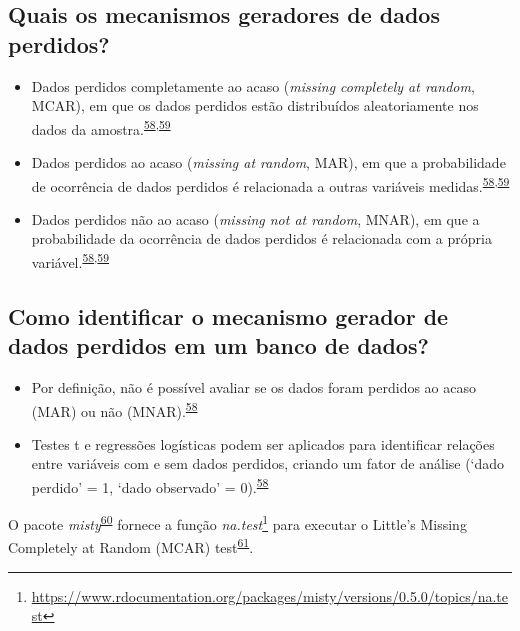 \documentclass[
  a4paper,
]{book}
\renewcommand{\href}[2]{#2\footnote{\url{#1}}}
\newenvironment{infobox}[1]
  {
  \begin{itemize}
  \renewcommand{\labelitemi}{
    \raisebox{-.7\height}[0pt][0pt]{
      {\setkeys{Gin}{width=3em,keepaspectratio}
        \texttt{[image: \#1]}}
    }
  }
  \setlength{\fboxsep}{1em}
  \begin{blackbox}
  \item
  }
  {
  \end{blackbox}
  \end{itemize}
  }
\begin{document}
\hypertarget{quais-os-mecanismos-geradores-de-dados-perdidos}{%
\subsection{Quais os mecanismos geradores de dados perdidos?}\label{quais-os-mecanismos-geradores-de-dados-perdidos}}

\begin{itemize}
\item
  Dados perdidos completamente ao acaso (\emph{missing completely at random}, MCAR), em que os dados perdidos estão distribuídos aleatoriamente nos dados da amostra.\textsuperscript{\protect\hyperlink{ref-Heymans2022}{58},\protect\hyperlink{ref-carpenter2021}{59}}
\item
  Dados perdidos ao acaso (\emph{missing at random}, MAR), em que a probabilidade de ocorrência de dados perdidos é relacionada a outras variáveis medidas.\textsuperscript{\protect\hyperlink{ref-Heymans2022}{58},\protect\hyperlink{ref-carpenter2021}{59}}
\item
  Dados perdidos não ao acaso (\emph{missing not at random}, MNAR), em que a probabilidade da ocorrência de dados perdidos é relacionada com a própria variável.\textsuperscript{\protect\hyperlink{ref-Heymans2022}{58},\protect\hyperlink{ref-carpenter2021}{59}}
\end{itemize}

\hypertarget{como-identificar-o-mecanismo-gerador-de-dados-perdidos-em-um-banco-de-dados}{%
\subsection{Como identificar o mecanismo gerador de dados perdidos em um banco de dados?}\label{como-identificar-o-mecanismo-gerador-de-dados-perdidos-em-um-banco-de-dados}}

\begin{itemize}
\item
  Por definição, não é possível avaliar se os dados foram perdidos ao acaso (MAR) ou não (MNAR).\textsuperscript{\protect\hyperlink{ref-Heymans2022}{58}}
\item
  Testes t e regressões logísticas podem ser aplicados para identificar relações entre variáveis com e sem dados perdidos, criando um fator de análise (`dado perdido' = 1, `dado observado' = 0).\textsuperscript{\protect\hyperlink{ref-Heymans2022}{58}}
\end{itemize}

\begin{infobox}{images/Rlogo}
O pacote \emph{misty}\textsuperscript{\protect\hyperlink{ref-misty}{60}} fornece a função \href{https://www.rdocumentation.org/packages/misty/versions/0.5.0/topics/na.test}{\emph{na.test}} para executar o Little's Missing Completely at Random (MCAR) test\textsuperscript{\protect\hyperlink{ref-little1988}{61}}.

\end{infobox}
\end{document}
